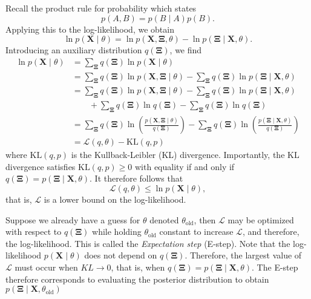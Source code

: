 Recall the product rule for probability which states
\begin{equation}
  p\left( A, B \right) = p\left( B \mid A \right) p\left( B \right).
\end{equation}
Applying this to the log-likelihood, we obtain
\begin{equation}
  \ln p\left( \mathbf{X} \mid \theta \right) = \ln p\left( \mathbf{X},\mathbf{\Xi}, \theta \right) - \ln p\left( \mathbf{\Xi}\mid \mathbf{X},\theta \right).
\end{equation}
Introducing an auxiliary distribution $q(\mathbf{\Xi})$, we find
\begin{align}
  \ln p\left( \mathbf{X}\mid\theta \right) &= \sum_{\mathbf{\Xi}}q(\mathbf{\Xi})\ln p\left( \mathbf{X}\mid\theta \right) \\
  &= \sum_{\mathbf{\Xi}}q(\mathbf{\Xi})\ln p\left( \mathbf{X}, \mathbf{\Xi}\mid \theta\right) - \sum_{\mathbf{\Xi}}q(\mathbf{\Xi})\ln p\left( \mathbf{\Xi} \mid \mathbf{X}, \theta \right) \\
                                           &= \sum_{\mathbf{\Xi}}q(\mathbf{\Xi})\ln p\left( \mathbf{X}, \mathbf{\Xi}\mid \theta\right) - \sum_{\mathbf{\Xi}}q(\mathbf{\Xi})\ln p\left( \mathbf{\Xi} \mid \mathbf{X}, \theta \right) \\
  &\qquad + \sum_{\mathbf{\Xi}}q(\mathbf{\Xi})\ln q(\mathbf{\Xi}) -  \sum_{\mathbf{\Xi}}q(\mathbf{\Xi})\ln q(\mathbf{\Xi}) \\
                                           &= \sum_{\mathbf{\Xi}}q(\mathbf{\Xi})\ln \left( \frac{p\left( \mathbf{X}, \mathbf{\Xi}\mid \theta\right)}{q(\mathbf{\Xi})}\right) - \sum_{\mathbf{\Xi}}q(\mathbf{\Xi})\ln \left( \frac{p\left( \mathbf{\Xi} \mid \mathbf{X}, \theta \right)}{q(\mathbf{\Xi})}\right) \\
  &= \mathcal{L}(q, \theta) - \text{KL}(q, p)
\end{align}
where $\text{KL}(q,p)$ is the Kullback-Leibler (KL) divergence. Importantly, the
KL divergence satisfies $\text{KL}(q,p) \geq 0$ with equality if and only if
$q(\mathbf{\Xi}) = p\left( \mathbf{\Xi}\mid \mathbf{X}, \theta \right)$. It
therefore follows that
\begin{equation}
  \mathcal{L}(q, \theta) \leq \ln p\left( \mathbf{X} \mid \theta \right),
\end{equation}
that is, $\mathcal{L}$ is a lower bound on the log-likelihood.

Suppose we already have a guess for $\theta$ denoted $\theta_{\text{old}}$, then
$\mathcal{L}$ may be optimized with respect to $q(\mathbf{\Xi})$ while holding
$\theta_{\text{old}}$ constant to increase $\mathcal{L}$, and therefore, the
log-likelihood. This is called the \textit{Expectation step} (E-step).
Note that the log-likelihood $p\left( \mathbf{X} \mid \theta \right)$ does
not depend on $q(\mathbf{\Xi})$. Therefore, the largest value of $\mathcal{L}$
must occur when $KL \to 0$, that is, when $q(\mathbf{\Xi}) = p\left(
  \mathbf{\Xi}\mid \mathbf{X}, \theta \right)$. The E-step therefore corresponds
to evaluating the posterior distribution to obtain $p\left( \mathbf{\Xi} \mid
  \mathbf{X}, \theta_{\text{old}} \right)$

